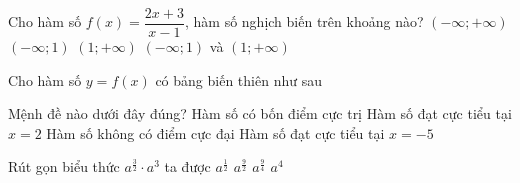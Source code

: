 \begin{ex}%
	Cho hàm số $f(x)=\dfrac{2x+3}{x-1}$, hàm số nghịch biến trên khoảng nào?
	\choice
	{$(-\infty;+\infty)$}
	{$(-\infty;1)$}
	{$(1;+\infty)$}
	{\True $(-\infty;1)$ và $(1;+\infty)$}
\end{ex}

\begin{ex}%
	Cho hàm số $y=f(x)$ có bảng biến thiên như sau
	\begin{center}
	\end{center}	
	Mệnh đề nào dưới đây đúng?
	\choice
	{Hàm số có bốn điểm cực trị}
	{\True Hàm số đạt cực tiểu tại $x=2$}
	{Hàm số không có điểm cực đại}
	{Hàm số đạt cực tiểu tại $x=-5$}
\end{ex}

\begin{ex}%
	Rút gọn biểu thức $a^{\frac{3}{2}}	\cdot a^3$ ta được
	\choice
	{$a^{\frac{1}{2}}$}
	{\True $a^{\frac{9}{2}}$}
	{$a^{\frac{9}{4}}$}
	{$a^{4}$}
\end{ex}

